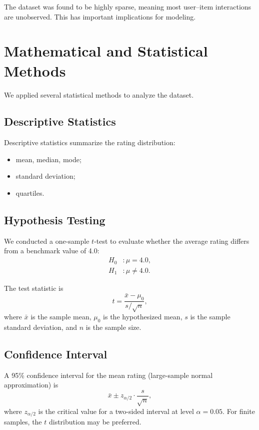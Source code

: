 \documentclass[conference]{IEEEtran}
\begin{document}
The dataset was found to be highly sparse, meaning most user--item interactions are unobserved. This has important implications for modeling.

\section{Mathematical and Statistical Methods}

We applied several statistical methods to analyze the dataset.

\subsection{Descriptive Statistics}

Descriptive statistics summarize the rating distribution:
\begin{itemize}
    \item mean, median, mode;
    \item standard deviation;
    \item quartiles.
\end{itemize}

\subsection{Hypothesis Testing}

We conducted a one-sample $t$-test to evaluate whether the average rating differs from a benchmark value of 4.0:
\begin{align}
    H_0 &: \mu = 4.0, \\
    H_1 &: \mu \neq 4.0.
\end{align}

The test statistic is
\begin{equation}
    t = \frac{\bar{x} - \mu_0}{s / \sqrt{n}},
\end{equation}
where $\bar{x}$ is the sample mean, $\mu_0$ is the hypothesized mean, $s$ is the sample standard deviation, and $n$ is the sample size.

\subsection{Confidence Interval}

A 95\% confidence interval for the mean rating (large-sample normal approximation) is
\begin{equation}
    \bar{x} \pm z_{\alpha/2} \cdot \frac{s}{\sqrt{n}},
\end{equation}
where $z_{\alpha/2}$ is the critical value for a two-sided interval at level $\alpha = 0.05$. For finite samples, the $t$ distribution may be preferred.
\end{document}
